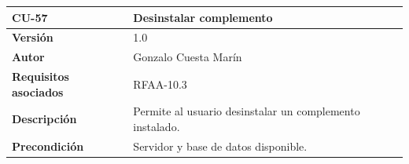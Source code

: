 \documentclass[
]{article}
\begin{document}
\begin{longtable}[]{@{}ll@{}}
\toprule
\begin{minipage}[b]{0.22\columnwidth}\raggedright
\textbf{CU-57}\strut
\end{minipage} & \begin{minipage}[b]{0.72\columnwidth}\raggedright
\textbf{Desinstalar complemento}\strut
\end{minipage}\tabularnewline
\midrule
\endhead
\begin{minipage}[t]{0.22\columnwidth}\raggedright
\textbf{Versión}\strut
\end{minipage} & \begin{minipage}[t]{0.72\columnwidth}\raggedright
1.0\strut
\end{minipage}\tabularnewline
\begin{minipage}[t]{0.22\columnwidth}\raggedright
\textbf{Autor}\strut
\end{minipage} & \begin{minipage}[t]{0.72\columnwidth}\raggedright
Gonzalo Cuesta Marín\strut
\end{minipage}\tabularnewline
\begin{minipage}[t]{0.22\columnwidth}\raggedright
\textbf{Requisitos asociados}\strut
\end{minipage} & \begin{minipage}[t]{0.72\columnwidth}\raggedright
RFAA-10.3\strut
\end{minipage}\tabularnewline
\begin{minipage}[t]{0.22\columnwidth}\raggedright
\textbf{Descripción}\strut
\end{minipage} & \begin{minipage}[t]{0.72\columnwidth}\raggedright
Permite al usuario desinstalar un complemento instalado.\strut
\end{minipage}\tabularnewline
\begin{minipage}[t]{0.22\columnwidth}\raggedright
\textbf{Precondición}\strut
\end{minipage} & \begin{minipage}[t]{0.72\columnwidth}\raggedright
Servidor y base de datos disponible.


\end{minipage}
\end{longtable}
\end{document}
